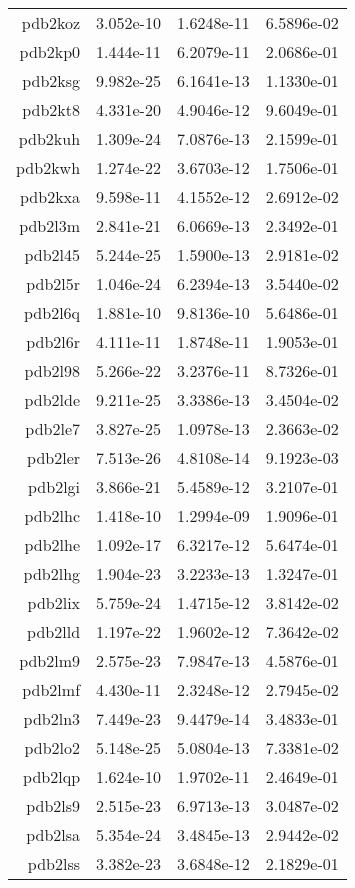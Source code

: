 \begin{xltabular}{\textwidth}{||rS[table-format=1.3e+2]S[table-format=1.4e+2]S[table-format=1.4e+2]||}
pdb2koz & 3.052e-10 & 1.6248e-11 & 6.5896e-02 \\
pdb2kp0 & 1.444e-11 & 6.2079e-11 & 2.0686e-01 \\
pdb2ksg & 9.982e-25 & 6.1641e-13 & 1.1330e-01 \\
pdb2kt8 & 4.331e-20 & 4.9046e-12 & 9.6049e-01 \\
pdb2kuh & 1.309e-24 & 7.0876e-13 & 2.1599e-01 \\
pdb2kwh & 1.274e-22 & 3.6703e-12 & 1.7506e-01 \\
pdb2kxa & 9.598e-11 & 4.1552e-12 & 2.6912e-02 \\
pdb2l3m & 2.841e-21 & 6.0669e-13 & 2.3492e-01 \\
pdb2l45 & 5.244e-25 & 1.5900e-13 & 2.9181e-02 \\
pdb2l5r & 1.046e-24 & 6.2394e-13 & 3.5440e-02 \\
pdb2l6q & 1.881e-10 & 9.8136e-10 & 5.6486e-01 \\
pdb2l6r & 4.111e-11 & 1.8748e-11 & 1.9053e-01 \\
pdb2l98 & 5.266e-22 & 3.2376e-11 & 8.7326e-01 \\
pdb2lde & 9.211e-25 & 3.3386e-13 & 3.4504e-02 \\
pdb2le7 & 3.827e-25 & 1.0978e-13 & 2.3663e-02 \\
pdb2ler & 7.513e-26 & 4.8108e-14 & 9.1923e-03 \\
pdb2lgi & 3.866e-21 & 5.4589e-12 & 3.2107e-01 \\
pdb2lhc & 1.418e-10 & 1.2994e-09 & 1.9096e-01 \\
pdb2lhe & 1.092e-17 & 6.3217e-12 & 5.6474e-01 \\
pdb2lhg & 1.904e-23 & 3.2233e-13 & 1.3247e-01 \\
pdb2lix & 5.759e-24 & 1.4715e-12 & 3.8142e-02 \\
pdb2lld & 1.197e-22 & 1.9602e-12 & 7.3642e-02 \\
pdb2lm9 & 2.575e-23 & 7.9847e-13 & 4.5876e-01 \\
pdb2lmf & 4.430e-11 & 2.3248e-12 & 2.7945e-02 \\
pdb2ln3 & 7.449e-23 & 9.4479e-14 & 3.4833e-01 \\
pdb2lo2 & 5.148e-25 & 5.0804e-13 & 7.3381e-02 \\
pdb2lqp & 1.624e-10 & 1.9702e-11 & 2.4649e-01 \\
pdb2ls9 & 2.515e-23 & 6.9713e-13 & 3.0487e-02 \\
pdb2lsa & 5.354e-24 & 3.4845e-13 & 2.9442e-02 \\
pdb2lss & 3.382e-23 & 3.6848e-12 & 2.1829e-01 \\

\end{xltabular}

